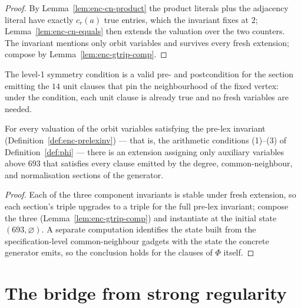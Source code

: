 \begin{proof}\leanok
By Lemma~\ref{lem:enc-cn-product} the product literals plus the adjacency
literal have exactly $c_r(a)$ true entries, which the invariant fixes at
$2$; Lemma~\ref{lem:enc-cn-equals} then extends the valuation over the two
counters.  The invariant mentions only orbit variables and survives every
fresh extension; compose by Lemma~\ref{lem:enc-gtrip-comp}.
\end{proof}

\begin{lemma}\label{lem:enc-sym1-section}
The level-1 symmetry condition is a valid pre- and postcondition for the
section emitting the $14$ unit clauses that pin the neighbourhood of the
fixed vertex: under the condition, each unit clause is already true and no
fresh variables are needed.
\leanok
{}
\end{lemma}

\begin{proposition}\label{prop:counters}
For every valuation of the orbit variables satisfying the pre-lex invariant
(Definition~\ref{def:enc-prelexinv}) --- that is, the arithmetic conditions
(1)--(3) of Definition~\ref{def:phi} --- there is an extension assigning
only auxiliary variables above $693$ that satisfies every clause emitted by
the degree, common-neighbour, and normalisation sections of the generator.
\leanok
{}
\end{proposition}

\begin{proof}\leanok
Each of the three component invariants is stable under fresh extension, so
each section's triple upgrades to a triple for the full pre-lex invariant;
compose the three (Lemma~\ref{lem:enc-gtrip-comp}) and instantiate at the
initial state $(693, \varnothing)$.  A separate computation identifies the
state built from the specification-level common-neighbour gadgets with the
state the concrete generator emits, so the conclusion holds for the clauses
of $\Phi$ itself.
\end{proof}

\section{The bridge from strong regularity}\label{ssec:enc-bridge}

